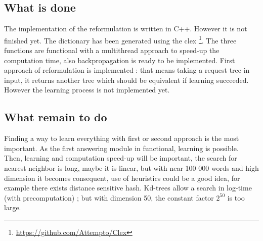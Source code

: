 \subsection{What is done}

The implementation of the reformulation is written in C++. However it is not finished yet. The dictionary has been generated using the clex \footnote{\url{https://github.com/Attempto/Clex}}. The three functions are functional with a multithread approach to speed-up the computation time, also backpropagation is ready to be implemented.
First approach of reformulation is implemented : that means taking a request tree in input, it returns another tree which should be equivalent if learning succeeded. However the learning process is not implemented yet.

\subsection{What remain to do}

Finding a way to learn everything with first or second approach is the most important. As the first answering module in functional, learning is possible. Then, learning and computation speed-up will be important, the search for nearest neighbor is long, maybe it is linear, but with near 100 000 words and high dimension it becomes consequent, use of heuristics could be a good idea, for example there exists distance sensitive hash. Kd-trees allow a search in log-time (with precomputation) ; but with dimension 50, the constant factor $2^{50}$ is too large. 

